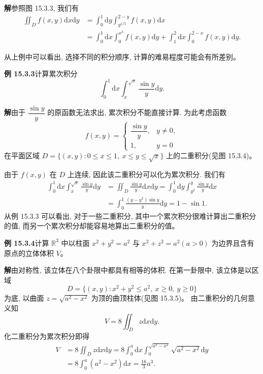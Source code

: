 \documentclass[UTF8, 12pt, fontset=fandol, oneside]{ctexart}
\begin{document}
\noindent\textbf{解}\quad 参照图 15.3.3, 我们有
\[
\begin{aligned}
  \iint_D f(x,y)\mathrm dx\mathrm dy
  &=\int_0^1\mathrm dy\int_{y^{1/3}}^{2-y}f(x,y)\mathrm dx\\
  &=\int_0^1\mathrm dx\int_0^{x^3}f(x,y)\mathrm dy
    +\int_1^2\mathrm dx\int_0^{2-x}f(x,y)\mathrm dy.
\end{aligned}
\]

从上例中可以看出, 选择不同的积分顺序, 计算的难易程度可能会有所差别。

\noindent\textbf{例 15.3.3}\quad 计算累次积分
\[
  \int_0^1\mathrm dx\int_x^{\sqrt x}\frac{\sin y}{y}\mathrm dy.
\]

\noindent\textbf{解}\quad 由于 $\dfrac{\sin y}{y}$ 的原函数无法求出, 累次积分不能直接计算. 为此考虑函数
\[
  f(x,y)=
  \begin{cases}
    \dfrac{\sin y}{y}, & y\ne0,\\
    1, & y=0
  \end{cases}
\]
在平面区域 $D=\{(x,y):0\leqslant x\leqslant1,\ x\leqslant y\leqslant\sqrt x\}$ 上的二重积分(见图 15.3.4)。

由于 $f(x,y)$ 在 $D$ 上连续, 因此该二重积分可以化为累次积分. 我们有
\[
\begin{aligned}
  \int_0^1\mathrm dx\int_x^{\sqrt x}\frac{\sin y}{y}\mathrm dy
  &=\iint_D\frac{\sin y}{y}\mathrm dx\mathrm dy
    =\int_0^1\mathrm dy\int_{y^2}^{y}\frac{\sin y}{y}\mathrm dx\\
  &=\int_0^1\frac{(y-y^2)\sin y}{y}\mathrm dy
    =1-\sin1.
\end{aligned}
\]
从例 15.3.3 可以看出, 对于一些二重积分, 其中一个累次积分很难计算出二重积分的值, 而另一个累次积分却能容易地算出二重积分的值。

\noindent\textbf{例 15.3.4}\quad 计算 $\mathbb R^3$ 中以柱面 $x^2+y^2=a^2$ 与 $x^2+z^2=a^2(a>0)$ 为边界且含有原点的立体体积 $V$。

\noindent\textbf{解}\quad 由对称性, 该立体在八个卦限中都具有相等的体积. 在第一卦限中, 该立体是以区域
\[
  D=\{(x,y):x^2+y^2\leqslant a^2,\ x\geqslant0,\ y\geqslant0\}
\]
为底, 以曲面 $z=\sqrt{a^2-x^2}$ 为顶的曲顶柱体(见图 15.3.5)。
由二重积分的几何意义知
\[
  V=8\iint_D z\mathrm dx\mathrm dy.
\]
化二重积分为累次积分即得
\[
\begin{aligned}
  V
  &=8\iint_D z\mathrm dx\mathrm dy
    =8\int_0^a\mathrm dx\int_0^{\sqrt{a^2-x^2}}\sqrt{a^2-x^2}\mathrm dy\\
  &=8\int_0^a(a^2-x^2)\mathrm dx
    =\frac{16}{3}a^3.
\end{aligned}
\]
\end{document}
